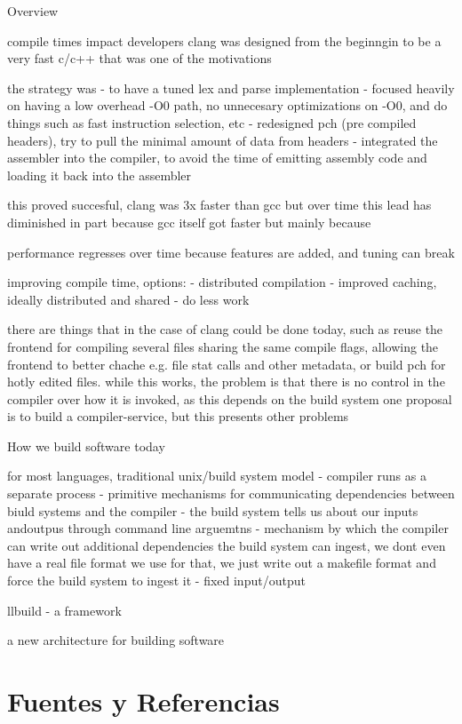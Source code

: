 \documentclass[12pt, a4paper]{report}
\begin{document}
Overview

compile times impact developers
clang was designed from the beginngin to be a very fast c/c++
that was one of the motivations

the strategy was
- to have a tuned lex and parse implementation
- focused heavily on having a low overhead -O0 path, no unnecesary optimizations on -O0, and do things such as fast instruction selection, etc
- redesigned pch (pre compiled headers), try to pull the minimal amount of data from headers
- integrated the assembler into the compiler, to avoid the time of emitting assembly code and loading it back into the assembler

this proved succesful, clang was 3x faster than gcc
but over time this lead has diminished
in part because gcc itself got faster but mainly because

performance regresses over time because features are added, and tuning can break

improving compile time, options:
- distributed compilation
- improved caching, ideally distributed and shared
- do less work

there are things that in the case of clang could be done today, such as reuse the frontend for compiling several files sharing the same compile flags, allowing the frontend to better chache e.g. file stat calls and other metadata, or build pch for hotly edited files.
while this works, the problem is that there is no control in the compiler over how it is invoked, as this depends on the build system
one proposal is to build a compiler-service, but this presents other problems

How we build software today

for most languages, traditional unix/build system model
- compiler runs as a separate process
- primitive mechanisms for communicating dependencies between biuld systems and the compiler
  - the build system tells us about our inputs andoutpus through command line arguemtns
  - mechanism by which the compiler can write out additional dependencies the build system can ingest, we dont even have a real file format we use for that, we just write out a makefile format and force the build system to ingest it
  - fixed input/output

llbuild - a framework

a new architecture for building software

\section*{Fuentes y Referencias}
\end{document}
